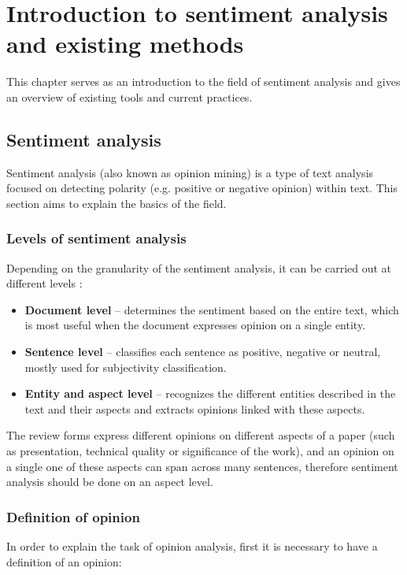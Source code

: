 
\chapter{Introduction to sentiment analysis and existing methods}
This chapter serves as an introduction to the field of sentiment analysis and gives an overview of existing tools and current practices.
\section{Sentiment analysis}
Sentiment analysis (also known as opinion mining) is a type of text analysis focused on detecting polarity (e.g. positive or negative opinion) within text. This section aims to explain the basics of the field.
\subsection{Levels of sentiment analysis}
Depending on the granularity of the sentiment analysis, it can be carried out at different levels \cite{liu_2015}:
\begin{itemize}
    \item \textbf{Document level} -- determines the sentiment based on the entire text, which is most useful when the document expresses opinion on a single entity.
    \item \textbf{Sentence level} -- classifies each sentence as positive, negative or neutral, mostly used for subjectivity classification.
    \item \textbf{Entity and aspect level} -- recognizes the different entities described in the text and their aspects and extracts opinions linked with these aspects.
    \end{itemize}
The review forms express different opinions on different aspects of a paper (such as presentation, technical quality or significance of the work), and an opinion on a single one of these aspects can span across many sentences, therefore sentiment analysis should be done on an aspect level.
\newpage
\subsection{Definition of opinion}
In order to explain the task of opinion analysis, first it is necessary to have a definition of an opinion:

